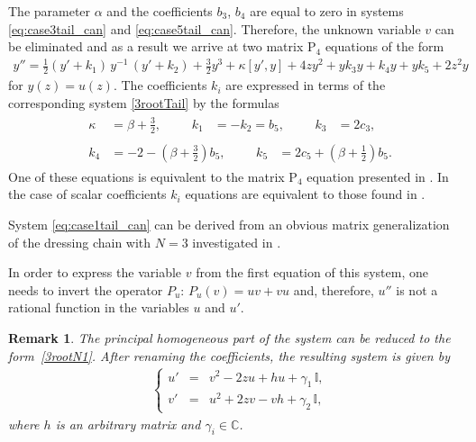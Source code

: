 \documentclass{article}
\theoremstyle{plain}
\newtheorem{remark}{Remark}
\newcommand{\brackets}[1]{\left( #1 \right)}
\begin{document}
The parameter $\alpha$ and the coefficients $b_3$, $b_4$ are equal to zero in systems \ref{eq:case3tail_can} and  \ref{eq:case5tail_can}. Therefore, the unknown variable $v$ can be eliminated and as a result we arrive at two matrix $\text{P}_4$ equations 
of the form 
\begin{equation}\label{P4mat}
\begin{array}{c}
 \displaystyle 
 y''
 = \frac{1}{2}(y' + k_1)
 \, y^{-1}
 \, (y' + k_2)  
 + \frac{3}{2} y^3
 + \kappa [y',y]
 + 4 z y^2
 + y k_{3} y
 + k_{4} y 
 + y k_{5} 
 + 2 z^2 y
 \end{array}
\end{equation}
for $y(z)=u(z)$.
The coefficients $k_i$ are expressed in terms of the corresponding system \eqref{3rootTail}  by the formulas 
\begin{align*}
    &\begin{aligned}
    \kappa
    \,\,
    &= \beta + \frac32,
    &&&
    k_1 
    &= - k_2
    = b_5,
    &&&
    k_3
    &= 2 c_3,
    \end{aligned}
    \\
    &\begin{aligned}
    k_4
    &= - 2 - \brackets{\beta + \frac32} b_5,
    &&&
    k_5
    &= 2 c_5 + \brackets{\beta + \frac12} b_5.
    \end{aligned}
\end{align*}
One of these equations is equivalent to the matrix $\text{P}_4$ equation presented in \cite{Adler_Sokolov_2020_1}.
In the case of scalar coefficients $k_i$ equations are equivalent to those found in  \cite{adler2020}.

System \ref{eq:case1tail_can} can be derived from an obvious matrix generalization of the dressing chain  with $N=3$ investigated in  \cite{veselov1993}.

In order to express the variable $v$ from the first equation of this system, one needs to invert the operator $P_u:\, P_u (v) = u v + v u$ and, therefore, $u''$ is not a rational function in the variables $u$ and $u'$.

\begin{remark} 
The principal homogeneous part of the \text{\rm\ref{eq:case1tail_can}} system can be reduced to the form~\eqref{3rootN1}. After renaming the coefficients, the resulting system is given by
\begin{align} \label{eq:case1tail_can_2}
    &\left\{
    \begin{array}{lcl}
         u' 
         &=& v^2 - 2 z u 
         + h u 
         + \gamma_1 \, \mathbb{I},
         \\[2mm]
         v' 
         &=& u^2 + 2 z v
         - v h
         + \gamma_2 \, \mathbb{I},
    \end{array}
    \right.
\end{align}
where $h$ is an arbitrary matrix and $\gamma_i \in \mathbb{C}$.
\end{remark}
\end{document}
